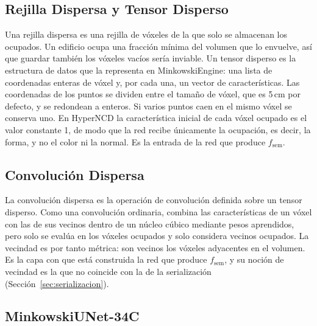 \subsection{Rejilla Dispersa y Tensor Disperso}
\label{sec:rejilla}
\label{sec:tensor}

Una rejilla dispersa es una rejilla de vóxeles de la que solo
se almacenan los ocupados. Un edificio ocupa una fracción mínima del volumen que
lo envuelve, así que guardar también los vóxeles vacíos sería inviable. Un
tensor disperso es la estructura de datos que la representa en
MinkowskiEngine: una lista de coordenadas enteras de vóxel y, por cada una, un
vector de características.
Las coordenadas de los puntos se dividen entre el
tamaño de vóxel, que es 5\,cm por defecto, y se redondean a enteros. Si varios
puntos caen en el mismo vóxel se conserva uno. En HyperNCD la característica
inicial de cada vóxel ocupado es el valor constante 1, de modo que la red recibe
únicamente la ocupación, es decir, la forma, y no el color ni la normal. Es la entrada de la red que produce
$f_{\mathrm{sem}}$.

\subsection{Convolución Dispersa}
\label{sec:convdispersa}

La convolución dispersa es la operación de convolución definida sobre un tensor disperso.
Como una convolución ordinaria, combina las
características de un vóxel con las de sus vecinos dentro de un núcleo cúbico
mediante pesos aprendidos, pero solo se evalúa en los vóxeles ocupados y solo
considera vecinos ocupados. La vecindad es por tanto métrica: son vecinos los vóxeles adyacentes en el volumen. Es la capa con que está construida la red que produce
$f_{\mathrm{sem}}$, y su noción de vecindad es la que no coincide con la de la
serialización (Sección~\ref{sec:serializacion}).

\subsection{MinkowskiUNet-34C}
\label{sec:minkunet}

